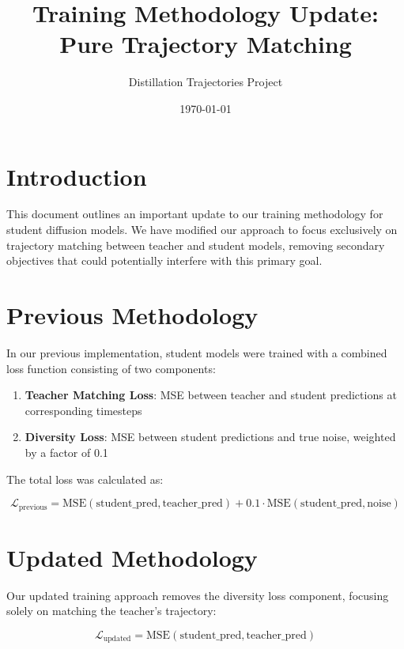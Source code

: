 \documentclass{article}
\title{Training Methodology Update: Pure Trajectory Matching}
\author{Distillation Trajectories Project}
\date{\today}
\begin{document}
\maketitle

\section{Introduction}

This document outlines an important update to our training methodology for student diffusion models. We have modified our approach to focus exclusively on trajectory matching between teacher and student models, removing secondary objectives that could potentially interfere with this primary goal.

\section{Previous Methodology}

In our previous implementation, student models were trained with a combined loss function consisting of two components:

\begin{enumerate}
  \item \textbf{Teacher Matching Loss}: MSE between teacher and student predictions at corresponding timesteps
  \item \textbf{Diversity Loss}: MSE between student predictions and true noise, weighted by a factor of 0.1
\end{enumerate}

The total loss was calculated as:

\begin{equation}
\mathcal{L}_{\text{previous}} = \text{MSE}(\text{student\_pred}, \text{teacher\_pred}) + 0.1 \cdot \text{MSE}(\text{student\_pred}, \text{noise})
\end{equation}

\section{Updated Methodology}

Our updated training approach removes the diversity loss component, focusing solely on matching the teacher's trajectory:

\begin{equation}
\mathcal{L}_{\text{updated}} = \text{MSE}(\text{student\_pred}, \text{teacher\_pred})
\end{equation}
\end{document}
